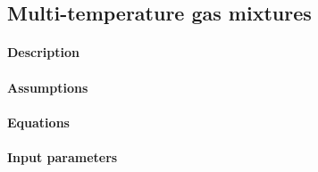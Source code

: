 \subsection{Multi-temperature gas mixtures}
\label{sec:multi-T}
\paragraph{Description}
\paragraph{Assumptions}
\paragraph{Equations}
\paragraph{Input parameters}


